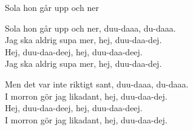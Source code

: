 \begin{song}{Sola hon går upp och ner}

	
	Sola hon går upp och ner, duu-daaa, du-daaa.\\
	Jag ska aldrig supa mer, hej, duu-daa-dej.\\
	Hej, duu-daa-deej, hej, duu-daa-deej.\\
	Jag ska aldrig supa mer, hej, duu-daa-dej.
	
	Men det var inte riktigt sant, duu-daaa, du-daaa.\\
	I morron gör jag likadant, hej, duu-daa-dej.\\
	Hej, duu-daa-deej, hej, duu-daa-deej.\\
	I morron gör jag likadant, hej, duu-daa-dej.
	
\end{song}
